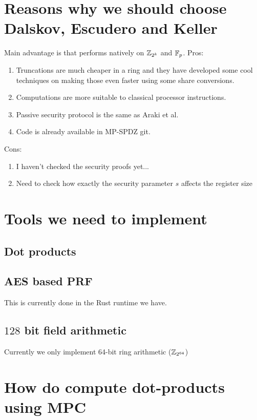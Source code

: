 \documentclass[11pt]{article}
\begin{document}
\section{Reasons why we should choose Dalskov, Escudero and Keller
\cite{cryptoeprint:2020:1330}}

Main advantage is that performs natively on $\mathbb{Z}_{2^k}$ and $\mathbb{F}_p$.
Pros:
\begin{enumerate}
  \item Truncations are much cheaper in a ring and they have developed some
  cool techniques on making those even faster using some share conversions.
  \item Computations are more suitable to classical processor instructions.
  \item Passive security protocol is the same as Araki et al.
  \item Code is already available in MP-SPDZ git.
\end{enumerate}

Cons:
\begin{enumerate}
  \item I haven't checked the security proofs yet...
  \item Need to check how exactly the security parameter $s$ affects the
  register size
\end{enumerate}

\section{Tools we need to implement}

\subsection{Dot products}
\subsection{}
\subsection{AES based PRF}
This is currently done in the Rust runtime we have.

\subsection{$128$ bit field arithmetic}
Currently we only implement 64-bit ring arithmetic ($\mathbb{Z}_{2^{64}}$)


\section{How do compute dot-products using MPC}
\end{document}
